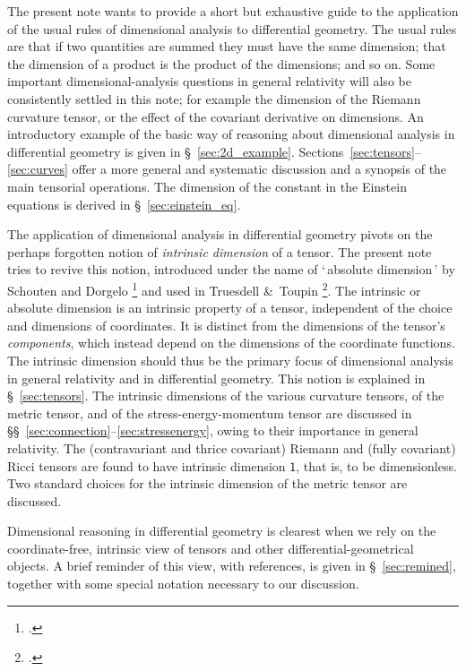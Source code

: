 \documentclass[\ifafour a4paper,12pt,\else a5paper,10pt,\fi%
onecolumn,oneside,article,%
british%
]{memoir}
\newcommand*{\defquote}[1]{`\,#1\,'}
\theoremstyle{remark}
\theoremstyle{innote}
\newcommand*{\citep}{\footcites}
\newcommand*{\amp}{\&}
\renewcommand*{\|}[1][]{\nonscript\,#1\vert\nonscript\;\mathopen{}}
\newcommand*{\sect}{\S}%
\newcommand*{\sects}{\S\S}%
\newcommand*{\chap}{ch.}%
\newcommand*{\Un}{\textsf{1}}
\begin{document}
The present note wants to provide a short but exhaustive guide to the
application of the usual rules of dimensional analysis to differential
geometry. The usual rules are that if two quantities are summed they must
have the same dimension; that the dimension of a product is the product of
the dimensions; and so on. Some important dimensional-analysis questions in
general relativity will also be consistently settled in this note; for
example the dimension of the Riemann curvature tensor, or the effect of the
covariant derivative on dimensions. An introductory example of the basic
way of reasoning about dimensional analysis in differential geometry is
given in \sect~\ref{sec:2d_example}.
Sections~\ref{sec:tensors}--\ref{sec:curves} offer a more general and
systematic discussion and a synopsis of the main tensorial operations. %
The dimension of the constant in the Einstein
equations is derived in \sect~\ref{sec:einstein_eq}.

The application of dimensional analysis in differential geometry pivots on
the perhaps forgotten notion of \emph{intrinsic dimension} of a tensor. The
present note tries to revive this notion, introduced under the name of
\defquote{absolute dimension} by Schouten and Dorgelo
\citep{dorgeloetal1946}[\chap~VI]{schouten1951_r1989} and used in Truesdell
\amp\ Toupin \citep[Appendix II]{truesdelletal1960}. The intrinsic or
absolute dimension is an intrinsic property of a tensor, independent of the
choice and dimensions of coordinates. It is distinct from the dimensions of
the tensor's \emph{components}, which instead depend on the dimensions of
the coordinate functions. The intrinsic dimension should thus be the
primary focus of dimensional analysis in general relativity and in
differential geometry. This notion is explained in \sect~\ref{sec:tensors}.
The intrinsic dimensions of the various curvature tensors, of the metric
tensor, and of the stress-energy-momentum tensor are discussed in
\sects~\ref{sec:connection}--\ref{sec:stressenergy}, owing to their
importance in general relativity. The (contravariant and thrice covariant)
Riemann and (fully covariant) Ricci tensors are found to have intrinsic
dimension $\Un$, that is, to be dimensionless. Two standard choices for the
intrinsic dimension of the metric tensor are discussed.

Dimensional reasoning in differential geometry is clearest when we rely on
the coordinate-free, intrinsic view of tensors and other
differential-geometrical objects. %
A brief reminder of this view, with references, is given in
\sect~\ref{sec:remined}, together with some special notation necessary to
our discussion.
\end{document}

